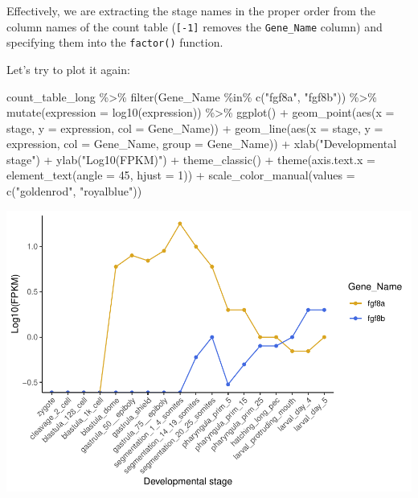 \documentclass[
]{article}
\newenvironment{Shaded}{\begin{snugshade}}{\end{snugshade}}
\newcommand{\AttributeTok}[1]{\textcolor[rgb]{0.77,0.63,0.00}{#1}}
\newcommand{\DecValTok}[1]{\textcolor[rgb]{0.00,0.00,0.81}{#1}}
\newcommand{\FunctionTok}[1]{\textcolor[rgb]{0.00,0.00,0.00}{#1}}
\newcommand{\NormalTok}[1]{#1}
\newcommand{\SpecialCharTok}[1]{\textcolor[rgb]{0.00,0.00,0.00}{#1}}
\newcommand{\StringTok}[1]{\textcolor[rgb]{0.31,0.60,0.02}{#1}}
\begin{document}
Effectively, we are extracting the stage names in the proper order from
the column names of the count table (\texttt{{[}-1{]}} removes the
\texttt{Gene\_Name} column) and specifying them into the
\texttt{factor()} function.

Let's try to plot it again:

\begin{Shaded}
\begin{Highlighting}[]
\NormalTok{count\_table\_long }\SpecialCharTok{\%\textgreater{}\%} 
  \FunctionTok{filter}\NormalTok{(Gene\_Name }\SpecialCharTok{\%in\%} \FunctionTok{c}\NormalTok{(}\StringTok{"fgf8a"}\NormalTok{, }\StringTok{"fgf8b"}\NormalTok{)) }\SpecialCharTok{\%\textgreater{}\%}
  \FunctionTok{mutate}\NormalTok{(}\AttributeTok{expression =} \FunctionTok{log10}\NormalTok{(expression)) }\SpecialCharTok{\%\textgreater{}\%} 
  \FunctionTok{ggplot}\NormalTok{() }\SpecialCharTok{+}
  \FunctionTok{geom\_point}\NormalTok{(}\FunctionTok{aes}\NormalTok{(}\AttributeTok{x =}\NormalTok{ stage, }\AttributeTok{y =}\NormalTok{ expression, }\AttributeTok{col =}\NormalTok{ Gene\_Name)) }\SpecialCharTok{+}
  \FunctionTok{geom\_line}\NormalTok{(}\FunctionTok{aes}\NormalTok{(}\AttributeTok{x =}\NormalTok{ stage, }\AttributeTok{y =}\NormalTok{ expression, }\AttributeTok{col =}\NormalTok{ Gene\_Name, }\AttributeTok{group =}\NormalTok{ Gene\_Name)) }\SpecialCharTok{+}
  \FunctionTok{xlab}\NormalTok{(}\StringTok{"Developmental stage"}\NormalTok{) }\SpecialCharTok{+}
  \FunctionTok{ylab}\NormalTok{(}\StringTok{"Log10(FPKM)"}\NormalTok{) }\SpecialCharTok{+}
  \FunctionTok{theme\_classic}\NormalTok{() }\SpecialCharTok{+}
  \FunctionTok{theme}\NormalTok{(}\AttributeTok{axis.text.x =} \FunctionTok{element\_text}\NormalTok{(}\AttributeTok{angle =} \DecValTok{45}\NormalTok{, }\AttributeTok{hjust =} \DecValTok{1}\NormalTok{)) }\SpecialCharTok{+}
  \FunctionTok{scale\_color\_manual}\NormalTok{(}\AttributeTok{values =} \FunctionTok{c}\NormalTok{(}\StringTok{"goldenrod"}\NormalTok{, }\StringTok{"royalblue"}\NormalTok{)) }
\end{Highlighting}
\end{Shaded}

\includegraphics{1_R_basics_and_tidyverse_files/figure-latex/unnamed-chunk-23-1.pdf}
\end{document}
